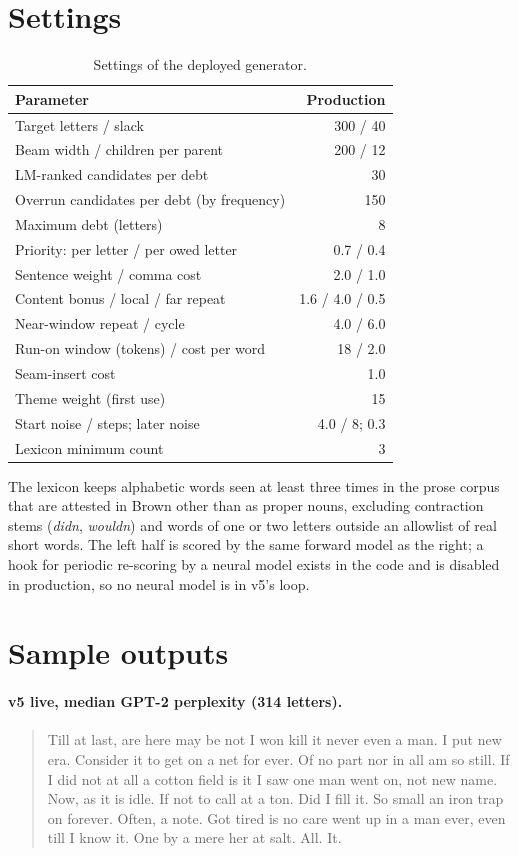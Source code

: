 \documentclass[11pt]{article}
\newcommand{\w}[1]{\emph{#1}}
\begin{document}
\section{Settings}\label{app:settings}
\begin{table}[h]
\centering\small
\begin{tabular}{@{}l r@{}}
\toprule
Parameter & Production \\
\midrule
Target letters / slack & 300 / 40 \\
Beam width / children per parent & 200 / 12 \\
LM-ranked candidates per debt & 30 \\
Overrun candidates per debt (by frequency) & 150 \\
Maximum debt (letters) & 8 \\
Priority: per letter / per owed letter & 0.7 / 0.4 \\
Sentence weight / comma cost & 2.0 / 1.0 \\
Content bonus / local / far repeat & 1.6 / 4.0 / 0.5 \\
Near-window repeat / cycle & 4.0 / 6.0 \\
Run-on window (tokens) / cost per word & 18 / 2.0 \\
Seam-insert cost & 1.0 \\
Theme weight (first use) & 15 \\
Start noise / steps; later noise & 4.0 / 8; 0.3 \\
Lexicon minimum count & 3 \\
\bottomrule
\end{tabular}
\caption{Settings of the deployed generator.}
\end{table}

The lexicon keeps alphabetic words seen at least three times in the prose corpus that are attested in Brown other than as proper nouns, excluding contraction stems (\w{didn}, \w{wouldn}) and words of one or two letters outside an allowlist of real short words. The left half is scored by the same forward model as the right; a hook for periodic re-scoring by a neural model exists in the code and is disabled in production, so no neural model is in v5's loop.

\section{Sample outputs}\label{app:samples}
\paragraph{v5 live, median GPT-2 perplexity (314 letters).}
\small
\begin{quote}
Till at last, are here may be not I won kill it never even a man. I put new era. Consider it to get on a net for ever. Of no part nor in all am so still. If I did not at all a cotton field is it I saw one man went on, not new name. Now, as it is idle. If not to call at a ton. Did I fill it. So small an iron trap on forever. Often, a note. Got tired is no care went up in a man ever, even till I know it. One by a mere her at salt. All. It.
\end{quote}
\normalsize
\end{document}
